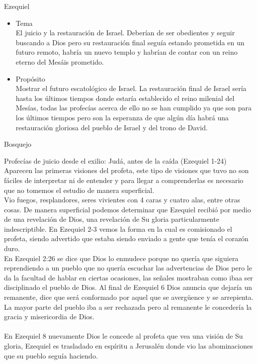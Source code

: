 \begin{section}{Ezequiel}
\begin{itemize}
	En la segunda parte del libro habla sobre la restauración futura.
\item Tema\\
	El juicio y la restauración de Israel. Deberían de ser obedientes y seguir buscando a Dios pero su restauración final seguía estando prometida en un futuro remoto, habría un nuevo templo y habrían de contar con un reino eterno del Mesáis prometido.
\item Propósito\\
	Mostrar el futuro escatológico de Israel. La restauración final de Israel sería hasta los últimos tiempos donde estaría establecido el reino milenial del Mesías, todas las profecías acerca de ello no se han cumplido ya que son para los últimos tiempos pero son la esperanza de que algún día habrá una restauración gloriosa del pueblo de Israel y del trono de David.
\end{itemize}
\begin{subsection}{Bosquejo}
	\begin{subsubsection}{Profecías de juicio desde el exilio: Judá, antes de la caída (Ezequiel 1-24)}
Aparecen las primeras visiones del profeta, este tipo de visiones que tuvo no son fáciles de interpretar ni de entender y para llegar a comprenderlas es necesario que no tomemos el estudio de manera superficial.\\
Vio fuegos, resplandores, seres vivientes con 4 caras y cuatro alas, entre otras cosas. De manera superficial podemos determinar que Ezequiel recibió por medio de una revelación de Dios, una revelación de Su gloria particularmente indescriptible. En Ezequiel 2-3 vemos la forma en la cual es comisionado el profeta, siendo advertido que estaba siendo enviado a gente que tenía el corazón duro.\\
En Ezequiel 2:26 se dice que Dios lo enmudece porque no quería que siguiera reprendiendo a un pueblo que no quería escuchar las advertencias de Dios pero le da la facultad de hablar en ciertas ocasiones, las señales mostraban como ibaa ser disciplinado el pueblo de Dios. Al final de Ezequiel 6 Dios anuncia que dejaría un remanente, dice que será conformado por aquel que se avergüence y se arrepienta. La mayor parte del pueblo iba a ser rechazada pero al remanente le concedería la gracia y misericordia de Dios.\\
\\
En Ezequiel 8 nuevamente Dios le concede al profeta que vea una visión de Su gloria, Ezequiel es trasladado en espíritu a Jerusalén donde vio las abominaciones que su pueblo seguía haciendo.\\

\end{subsubsection}
\end{subsection}
\end{section}
